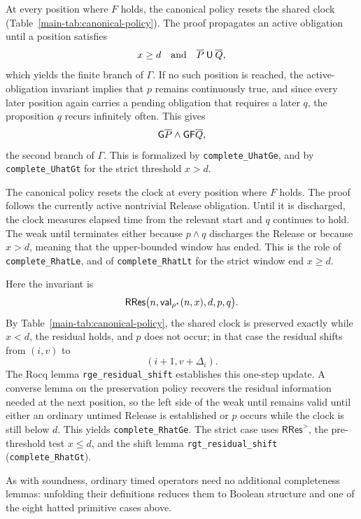 At every position where $F$ holds, the canonical policy resets the shared
clock (Table~\ref{main-tab:canonical-policy}).  The proof propagates an active obligation until a position satisfies
\[
  x\ge d
  \quad\text{and}\quad
  \overline{P}\mathbin{\mathsf{U}} \overline{Q},
\]
which yields the finite branch of $\Gamma$.  If no such position is reached,
the active-obligation invariant implies that $p$ remains continuously true,
and since every later position again carries a pending obligation that
requires a later $q$, the proposition $q$ recurs infinitely often.  This gives
\[
  \mathsf{G} \overline{P}\land\mathsf{G}\mathsf{F} \overline{Q},
\]
the second branch of $\Gamma$.  This is formalized by
\texttt{complete\_\allowbreak{}UhatGe}, and by
\texttt{complete\_\allowbreak{}UhatGt} for the strict threshold $x>d$.

The canonical policy resets the clock at every position where $F$ holds.  The
proof follows the currently active nontrivial Release obligation.  Until it
is discharged, the clock measures elapsed time from the relevant start and
$q$ continues to hold.  The weak until terminates either because $p\land q$
discharges the Release or because $x>d$, meaning that the upper-bounded window
has ended.  This is the role of \texttt{complete\_\allowbreak{}RhatLe}, and of
\texttt{complete\_\allowbreak{}RhatLt} for the strict window end $x\ge d$.

Here the invariant is
\[
  \mathsf{RRes}
  \bigl(n,\mathsf{val}_{\rho^\star}(n,x),d,p,q\bigr).
\]
By Table~\ref{main-tab:canonical-policy}, the shared clock is preserved exactly
while $x<d$, the residual holds, and $p$ does not occur; in that case the
residual shifts
from $(i,v)$ to
\[
  (i+1,v+\Delta_i).
\]
The Rocq lemma \texttt{rge\_\allowbreak{}residual\_\allowbreak{}shift} establishes this one-step update.
A converse lemma on the preservation policy recovers the residual information needed
at the next position, so the left side of the weak until remains valid until
either an ordinary untimed Release is established or $p$ occurs while the
clock is still below $d$.  This yields \texttt{complete\_\allowbreak{}RhatGe}.
The strict case uses $\mathsf{RRes}^{>}$, the pre-threshold test $x\le d$, and
the shift lemma \texttt{rgt\_\allowbreak{}residual\_\allowbreak{}shift}
(\texttt{complete\_\allowbreak{}RhatGt}).

As with soundness, ordinary timed operators need no additional completeness
lemmas: unfolding their definitions reduces them to Boolean structure and one
of the eight hatted primitive cases above.

